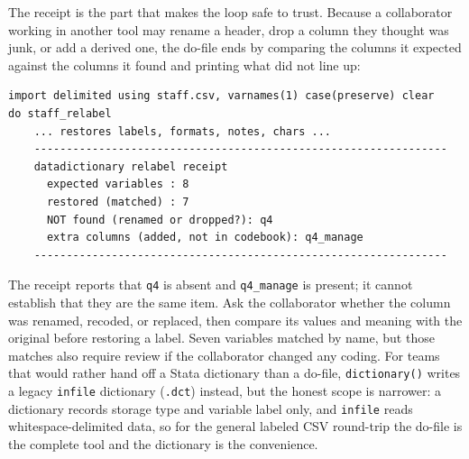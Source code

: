\documentclass[
    a4paper,
    fontsize=10pt,
    twoside=true,
    numbers=noenddot,
]{kaobook}
\begin{document}
The receipt is the part that makes the loop safe to trust. Because a collaborator working in another tool may rename a header, drop a column they thought was junk, or add a derived one, the do-file ends by comparing the columns it expected against the columns it found and printing what did not line up:
\par
{\footnotesize
\begin{verbatim}
import delimited using staff.csv, varnames(1) case(preserve) clear
do staff_relabel
    ... restores labels, formats, notes, chars ...
    ----------------------------------------------------------------
    datadictionary relabel receipt
      expected variables : 8
      restored (matched) : 7
      NOT found (renamed or dropped?): q4
      extra columns (added, not in codebook): q4_manage
    ----------------------------------------------------------------
\end{verbatim}
}
The receipt reports that \texttt{q4} is absent and \texttt{q4\_manage} is present; it cannot establish that they are the same item. Ask the collaborator whether the column was renamed, recoded, or replaced, then compare its values and meaning with the original before restoring a label. Seven variables matched by name, but those matches also require review if the collaborator changed any coding. For teams that would rather hand off a Stata dictionary than a do-file, \texttt{dictionary()} writes a legacy \texttt{infile} dictionary (\texttt{.dct}) instead, but the honest scope is narrower: a dictionary records storage type and variable label only, and \texttt{infile} reads whitespace-delimited data, so for the general labeled CSV round-trip the do-file is the complete tool and the dictionary is the convenience.
\end{document}

